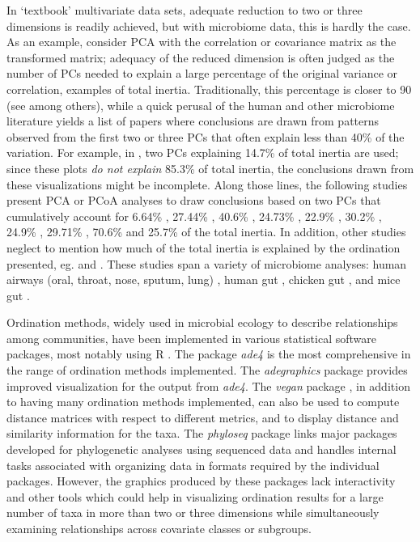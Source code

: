 \documentclass[doublespacing]{bmcart}
\begin{document}
In `textbook' multivariate data sets, adequate reduction to two or three dimensions is readily achieved, but with microbiome data, this is hardly the case. As an example, consider PCA with the correlation or covariance matrix as the transformed matrix; adequacy of the reduced dimension is often judged as the number of PCs needed to explain a large percentage of the original variance or correlation, examples of total inertia. Traditionally, this percentage is closer to 90 (see \cite{Izenman} among others), while a quick perusal of the human and other microbiome literature yields a list of papers where conclusions are drawn from patterns observed from the first two or three PCs that often explain less than 40\% of the variation. 
For example, in \cite{Sellitto}, two PCs explaining 14.7\% of total inertia are used; since these plots {\it do not explain} 85.3\% of total inertia, the conclusions drawn from these visualizations might be incomplete.  Along those lines, the following studies present PCA or PCoA analyses to draw conclusions based on two PCs that cumulatively account for 6.64\% \cite{Gong}, 27.44\%  \cite{Kraneveld}, 40.6\% \cite{Boutin}, 24.73\% \cite{Claud}, 22.9\% \cite{Shankar}, 30.2\% \cite{Dickson}, 24.9\% \cite{Pourabedin}, 29.71\% \cite{Lu}, 70.6\% \cite{Langille} and 25.7\% \cite{Hansen} of the total inertia. In addition, other studies neglect to mention how much of the total inertia is explained by the ordination presented, eg.  \cite{Fouts} and \cite{Cribbs}.  These studies span a variety of microbiome analyses:  human airways (oral, throat, nose, sputum, lung) \cite{Gong, Kraneveld, Boutin, Cribbs}, human gut \cite{Claud, Shankar}, chicken gut \cite{Pourabedin}, and mice gut  \cite{Lu, Langille, Hansen}. 

Ordination  methods, widely used in microbial ecology to describe relationships among communities, have been implemented in various statistical software packages, most notably using R \cite{R}. The package {\it ade4} \cite{Dray1, Dray2, Chessel} is the most comprehensive in the range of ordination methods implemented.  The {\it adegraphics} \cite{adegraphics} package provides improved visualization for the output from {\it ade4}. The {\it vegan} package \cite{vegan}, in addition to having many ordination methods implemented, can also be used to compute distance matrices with respect to different metrics, and to display distance and similarity information for the taxa.  The {\it phyloseq} package \cite{phyloseq} links major packages developed for phylogenetic analyses using sequenced data and handles internal tasks associated with organizing data in formats required by the individual packages. However, the graphics produced by these packages lack interactivity and other tools which could help in visualizing ordination results for a large number of taxa in more than two or three dimensions while simultaneously examining relationships across covariate classes or subgroups.  
\end{document}
